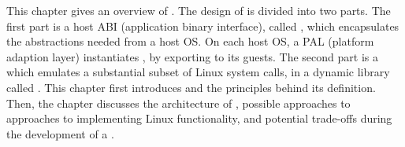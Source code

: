 This chapter gives an overview of \graphene{}.
The design of \graphene{} is divided into two parts.
The first part is a host ABI (application binary interface), called \thehostabi{}, which encapsulates the abstractions needed from a host OS.
On each host OS, a PAL (platform adaption layer) instantiates \thehostabi{},
by exporting \palcallnum{} \hostapis{}
to its guests.
The second part is a \libos{} which emulates a substantial subset of Linux system calls,
in a dynamic library called \thelibos{}.
This chapter first introduces \thehostabi{} and the principles behind its definition.
Then, the chapter discusses the architecture of \thelibos{},
possible approaches to
approaches to implementing Linux functionality,
and potential trade-offs
during the development of a \libos{}.


